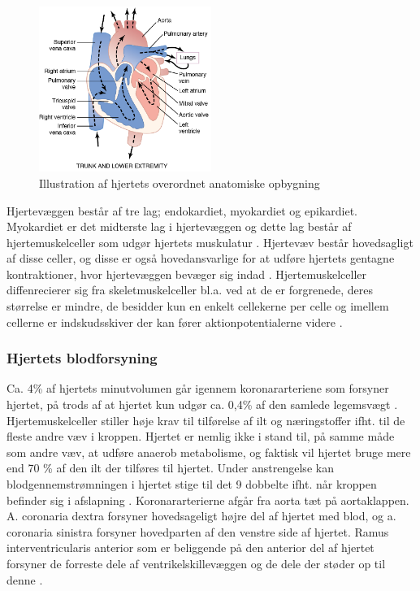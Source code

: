 \begin{figure}[H] %
\begin{center}
\includegraphics[width=0.5\textwidth]{figures/hjertet_overordnet}
\end{center}
\caption{Illustration af hjertets overordnet anatomiske opbygning \cite{Guyton2006}}
\label{fig:hjerte_overordnet}
\end{figure}


Hjertevæggen består af tre lag; endokardiet, myokardiet og epikardiet. Myokardiet er det midterste lag i hjertevæggen og dette lag består af hjertemuskelceller som udgør hjertets muskulatur \cite{gronanatomi}. Hjertevæv består hovedsagligt af disse celler, og disse er også hovedansvarlige for at udføre hjertets gentagne kontraktioner, hvor hjertevæggen bevæger sig indad \cite{cindy}. 
Hjertemuskelceller diffenrecierer sig fra skeletmuskelceller bl.a. ved at de er forgrenede, deres størrelse er mindre, de besidder kun en enkelt cellekerne per celle og imellem cellerne er indskudsskiver der kan fører aktionpotentialerne videre \cite{martini}.




\subsubsection{Hjertets blodforsyning}
Ca. 4\% af hjertets minutvolumen går igennem koronararteriene som forsyner hjertet, på trods af at hjertet kun udgør ca. 0,4\% af den samlede legemsvægt \cite{gronanatomi}. Hjertemuskelceller stiller høje krav til tilførelse af ilt og næringstoffer ifht. til de fleste andre væv i kroppen. Hjertet er nemlig ikke i stand til, på samme måde som andre væv, at udføre anaerob metabolisme, og faktisk vil hjertet bruge mere end 70 \% af den ilt der tilføres til hjertet. Under anstrengelse kan blodgennemstrømningen i hjertet stige til det 9 dobbelte ifht. når kroppen befinder sig i afslapning \cite{martini}. Koronararterierne afgår fra aorta tæt på aortaklappen. A. coronaria dextra forsyner hovedsageligt højre del af hjertet med blod, og a. coronaria sinistra forsyner hovedparten af den venstre side af hjertet. Ramus interventricularis anterior som er beliggende på den anterior del af hjertet forsyner de forreste dele af ventrikelskillevæggen og de dele der støder op til denne \cite{gronanatomi}.


